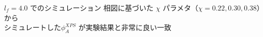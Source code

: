 \documentclass[12pt, dvipdfmx]{beamer}
\begin{document}
\begin{frame}
\begin{columns}
\begin{column}{6.0cm}
\begin{figure}[htbp]
\begin{center}
			\end{center}
		\end{figure}
	\end{column}
\end{columns}

\begin{alertblock}{$l_f = 4.0$ でのシミュレーション}
相図に基づいた $\chi$ パラメタ（$\chi = 0.22, 0.30, 0.38$）から\\シミュレートした$\phi_A^{XPS}$ が実験結果と非常に良い一致
\end{alertblock}
\end{frame}
\end{document}
